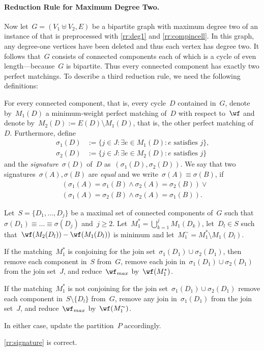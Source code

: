 \paragraph{Reduction Rule for Maximum Degree Two.}Now let~$G = (V_1 \uplus V_2, E)$ be a bipartite graph with maximum degree two of an instance of \pCBMs{} that is preprocessed with \autoref{rr:deg1} and \autoref{rr:compincell}. In this graph, any degree-one vertices have been deleted and thus each vertex has degree two. It follows that~$G$ consists of connected components each of which is a cycle of even length---because~$G$ is bipartite. Thus every connected component has exactly two perfect matchings. To describe a third reduction rule, we need the following definitions:
\begin{definition}
  For every connected component, that is, every cycle~$D$ contained in~$G$, denote by~$M_1(D)$ a minimum-weight perfect matching of~$D$ with respect to~$\wf$ and denote by~$M_2(D) := E(D) \setminus M_1(D)$, that is, the other perfect matching of~$D$. Furthermore, define
\begin{align*}
  \sigma_1(D) &:= \{j \in J : \exists e \in M_1(D): e \text{ satisfies } j\} \text{,} \\
  \sigma_2(D) &:= \{j \in J : \exists e \in M_2(D): e \text{ satisfies } j\}
\end{align*}
and the \emph{signature}~$\sigma(D)$ of~$D$ as~$(\sigma_1(D), \sigma_2(D))$. We say that two signatures~$\sigma(A), \sigma(B)$ are \emph{equal} and we write~$\sigma(A) \equiv \sigma(B)$, if
\begin{align*}
  &(\sigma_1(A) = \sigma_1(B) \wedge \sigma_2(A) = \sigma_2(B)) \vee {}\\
  &(\sigma_1(A) = \sigma_2(B) \wedge \sigma_2(A) = \sigma_1(B)) \text{.}
\end{align*}
\end{definition}
\begin{rrule}\label{rr:signature}
  Let~$S = \{D_{1}, \ldots, D_{j}\}$ be a maximal set of connected components of~$G$ such that~$\sigma(D_{1}) \equiv \ldots \equiv \sigma(D_{j})$ and~$j \geq 2$. Let~$M^*_1 =\bigcup_{k = 1}^jM_1(D_k)$, let~$D_{l} \in S$ such that~$\wf(M_2(D_{l}))-\wf(M_1(D_{l}))$ is minimum and let~$M^\sim_1 = M^*_1 \setminus M_1(D_l)$.\begin{lemenum}
  \item If the matching~$M_1^*$ is conjoining for the join set~$\sigma_1(D_{1}) \cup \sigma_2(D_{1})$, then remove each component in~$S$ from~$G$, remove each join in~$\sigma_1(D_{1}) \cup \sigma_2(D_{1})$ from the join set~$J$, and reduce~$\wf_{max}$ by~$\wf(M_1^*)$.
  \item If the matching~$M_1^*$ is not conjoining for the join set~$\sigma_1(D_{1}) \cup \sigma_2(D_{1})$ remove each component in~$S \setminus \{D_{l}\}$ from~$G$, remove any join in~$\sigma_1(D_{1})$ from the join set~$J$, and reduce~$\wf_{max}$ by~$\wf(M_1^\sim)$. 
  \end{lemenum}

  In either case, update the partition~$P$ accordingly.
\end{rrule}\begin{lemma}
  \autoref{rr:signature} is correct.
\end{lemma}
